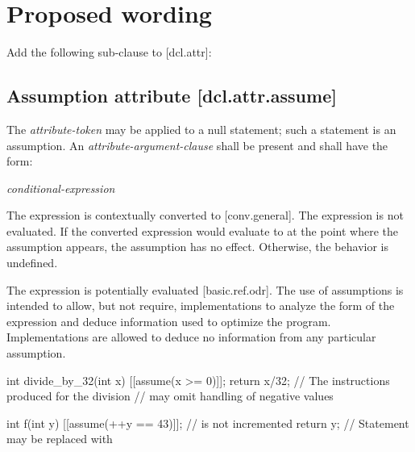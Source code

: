 \pagebreak

\section{Proposed wording}
\label{sec:wording}

Add the following sub-clause to [dcl.attr]:

\begin{adjustwidth}{0.5cm}{0.5cm}
\begin{addedblock}
\subsection*{Assumption attribute \hspace{7.33cm} [dcl.attr.assume]}

The \textit{attribute-token}  may be applied to a null statement; such a statement is an assumption. An \textit{attribute-argument-clause} shall be present and shall have the form:

\hspace{5mm}\tcode{( }\textit{conditional-expression}\tcode{ )}

The expression is contextually converted to  [conv.general]. The expression is not evaluated. If the converted expression would evaluate to  at the point where the assumption appears, the assumption has no effect. Otherwise, the behavior is undefined.

\begin{note}
The expression is potentially evaluated [basic.ref.odr]. The use of assumptions is intended to allow, but not require, implementations to analyze the form of the expression and deduce information used to optimize the program. Implementations are allowed to deduce no information from any particular assumption.
\end{note}

\begin{example}
\begin{codeblock}
int divide_by_32(int x)  {
  [[assume(x >= 0)]];
  return x/32;   // The instructions produced for the division
                 //  may omit handling of negative values
}

int f(int y) {
  [[assume(++y == 43)]];   //  is not incremented
  return y;                // Statement may be replaced with 
}
\end{codeblock}
\end{example}
\end{addedblock}
\end{adjustwidth}


